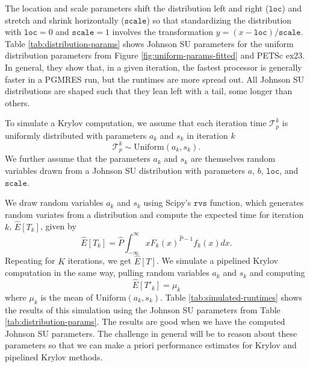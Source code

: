 \documentclass[sigconf]{acmart}
\begin{document}
The location and scale parameters shift the distribution left and right (${\texttt{loc}}$) and stretch and shrink horizontally (${\texttt{scale}}$) so that standardizing the distribution with ${\texttt{loc}} = 0$ and ${\texttt{scale}} = 1$ involves the transformation $y = (x - {\texttt{loc}})/{\texttt{scale}}$.
Table \ref{tab:distribution-params} shows Johnson SU parameters for the  uniform distribution parameters from Figure \ref{fig:uniform-params-fitted} and PETSc ex23. In general, they show that, in a given iteration, the fastest processor is generally faster in a PGMRES run, but the runtimes are more spread out. All Johnson SU distributions are shaped such that they lean left with a tail, some longer than others.

To simulate a Krylov computation, we assume that each iteration time $\mathcal{T}_p^k$ is uniformly distributed with parameters $a_k$ and $s_k$ in iteration $k$
$$\mathcal{T}_p^k \sim \text{Uniform}(a_k, s_k).$$ 
We further assume that the parameters $a_k$ and $s_k$ are themselves random variables drawn from a Johnson SU distribution with parameters $a$, $b$, $\texttt{loc}$, and $\texttt{scale}$.

We draw random variables $a_k$ and $s_k$  using Scipy's $\texttt{rvs}$ function, which generates random variates from a distribution and compute the expected time for iteration $k$, $\widehat{E}[T_k]$, given by 
\begin{equation}
\widehat{E}[T_k] =  \widehat{P} \int ^{\infty}_{-\infty} x F_k(x)^{\widehat{P}-1} f_k(x) dx.
\end{equation}
Repeating for $K$ iterations, we get $\widehat{E}[T]$. 
We simulate a pipelined Krylov computation in the same way, pulling random variables $a_k$ and $s_k$ and computing 
\begin{equation}
\widehat{E}[T'_k] =  \mu_k
\end{equation}
where $\mu_k$ is the mean of $\text{Uniform}(a_k, s_k)$. 
Table \ref{tab:simulated-runtimes} shows the results of this simulation using the Johnson SU parameters from Table \ref{tab:distribution-params}. The results are good when we have the computed Johnson SU parameters. The challenge in general will be to reason about these parameters so that we can make a priori performance estimates for Krylov and pipelined Krylov methods.
\end{document}
